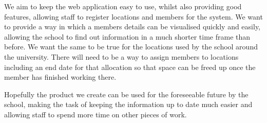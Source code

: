 \documentclass[11pt,a4paper]{article}
\begin{document}
We aim to keep the web application easy to use, whilst also providing good features, allowing staff to register locations and members for the system. We want to provide a way in which a members details can be visualised quickly and easily, allowing the school to find out information in a much shorter time frame than before. We want the same to be true for the locations used by the school around the university. There will need to be a way to assign members to locations including an end date for that allocation so that space can be freed up once the member has finished working there.
\bigskip

Hopefully the product we create can be used for the foreseeable future by the school, making the task of keeping the information up to date much easier and allowing staff to spend more time on other pieces of work.
\bigskip
\end{document}
